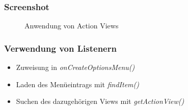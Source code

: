 \begin{frame}
   \frametitle{Screenshot}
   \begin{figure}[h!]
     \centering
     \hfill
     \caption{
        Anwendung von Action Views
     }
     \label{fig:action_view}
   \end{figure}
\end{frame}

\begin{frame}
   \frametitle{Verwendung von Listenern}
   \begin{itemize}
      \item Zuweisung in \emph{onCreateOptionsMenu()}
      \item Laden des Menüeintrags mit \emph{findItem()}
      \item Suchen des dazugehörigen Views mit \emph{getActionView()}
   \end{itemize}

   
\end{frame}

